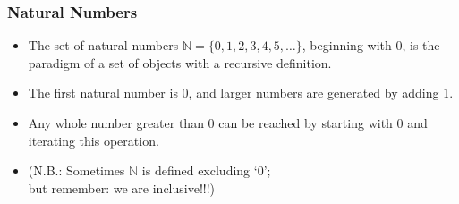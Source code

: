 

\begin{frame}
\frametitle{Natural Numbers}

\begin{itemize}[<+->]

\item The set of natural numbers $\mathbb{N} = \{ 0, 1, 2, 3, 4, 5, \ldots \}$, beginning with $0$, is the
paradigm of a set of objects with a recursive definition.

\item The first natural number is $0$, and larger numbers are generated by adding $1$. 

\item Any whole number greater than $0$ can be reached by starting with $0$ and iterating this operation.  

\item (N.B.: Sometimes $\mathbb{N}$ is defined excluding `0'; \\ but remember: we are inclusive!!!)

\end{itemize} 
\end{frame}

